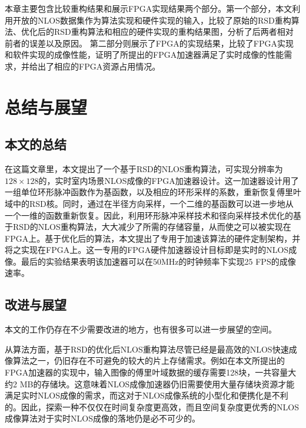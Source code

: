 \documentclass[master]{shtthesis}             %
\begin{document}
本章主要包含比较重构结果和展示FPGA实现结果两个部分。第一个部分，本文利用开放的NLOS数据集作为算法实现和硬件实现的输入，比较了原始的RSD重构算法、优化后的RSD重构算法和相应的硬件实现的重构结果图，分析了后两者相对前者的误差以及原因。
第二部分则展示了FPGA的实现结果，比较了FPGA实现和软件实现的成像性能，证明了所提出的FPGA加速器满足了实时成像的性能需求，并给出了相应的FPGA资源占用情况。

\chapter{总结与展望}

\section{本文的总结}

在这篇文章里，本文提出了一个基于RSD的NLOS重构算法，可实现分辨率为$128\times 128$的，实时室内场景NLOS成像的FPGA加速器设计。这一加速器设计用了一组单位环形脉冲函数作为基函数，以及相应的环形采样的系数，重新恢复傅里叶域中的RSD核。同时，通过在半径方向采样，一个二维的基函数可以进一步地从一个一维的函数重新恢复。因此，利用环形脉冲采样技术和径向采样技术优化的基于RSD的NLOS重构算法，大大减少了所需的存储容量，从而使之可以被实现在FPGA上。基于优化后的算法，本文提出了专用于加速该算法的硬件定制架构，并将之实现在FPGA上。这一专用的FPGA硬件加速器设计目标即是实时的NLOS成像。最后的实验结果表明该加速器可以在50MHz的时钟频率下实现25 FPS的成像速率。

\section{改进与展望}

本文的工作仍存在不少需要改进的地方，也有很多可以进一步展望的空间。

从算法方面，基于RSD的优化后NLOS重构算法尽管已经是最高效的NLOS快速成像算法之一，仍旧存在不可避免的较大的片上存储需求。例如在本文所提出的FPGA加速器的实现中，输入图像的傅里叶域数据的缓存需要128块，一共容量大约2 MB的存储块。这意味着NLOS成像加速器仍旧需要使用大量存储块资源才能满足实时NLOS成像的需求，而这对于NLOS成像系统的小型化和便携化是不利的。因此，探索一种不仅仅在时间复杂度更高效，而且空间复杂度更优秀的NLOS成像算法对于实时NLOS成像的落地仍是必不可少的。
\end{document}
